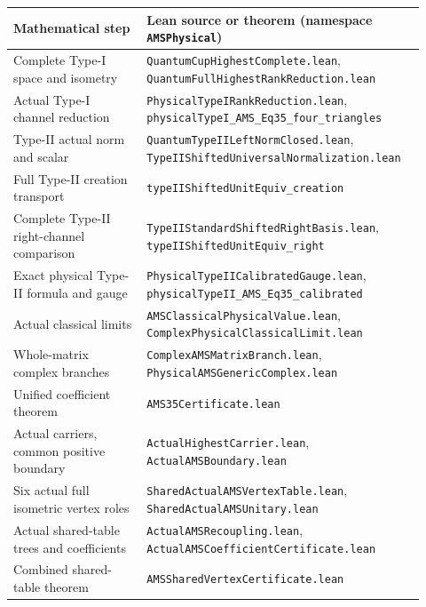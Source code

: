 \documentclass[10pt,a4paper]{article}
\newcommand{\lean}[1]{{\small\nolinkurl{#1}}}
\newenvironment{revision}{\begingroup}{\endgroup}
\begin{document}
\begin{revision}
\begin{center}
\small
\begin{tabular}{>{\raggedright\arraybackslash}p{0.31\linewidth}>{\raggedright\arraybackslash}p{0.61\linewidth}}
\toprule
Mathematical step & Lean source or theorem (namespace \lean{AMSPhysical})\\
\midrule
Complete Type-I space and isometry &
 \lean{QuantumCupHighestComplete.lean},
 \lean{QuantumFullHighestRankReduction.lean}\\[3pt]
Actual Type-I channel reduction &
 \lean{PhysicalTypeIRankReduction.lean},
 \lean{physicalTypeI_AMS_Eq35_four_triangles}\\[3pt]
Type-II actual norm and scalar &
 \lean{QuantumTypeIILeftNormClosed.lean},
 \lean{TypeIIShiftedUniversalNormalization.lean}\\[3pt]
Full Type-II creation transport &
 \lean{typeIIShiftedUnitEquiv_creation}\\[3pt]
Complete Type-II right-channel comparison &
 \lean{TypeIIStandardShiftedRightBasis.lean},
 \lean{typeIIShiftedUnitEquiv_right}\\[3pt]
Exact physical Type-II formula and gauge &
 \lean{PhysicalTypeIICalibratedGauge.lean},
 \lean{physicalTypeII_AMS_Eq35_calibrated}\\[3pt]
Actual classical limits &
 \lean{AMSClassicalPhysicalValue.lean},
 \lean{ComplexPhysicalClassicalLimit.lean}\\[3pt]
Whole-matrix complex branches &
 \lean{ComplexAMSMatrixBranch.lean},
 \lean{PhysicalAMSGenericComplex.lean}\\[3pt]
Unified coefficient theorem & \lean{AMS35Certificate.lean}\\[3pt]
Actual carriers, common positive boundary &
 \lean{ActualHighestCarrier.lean}, \lean{ActualAMSBoundary.lean}\\[3pt]
Six actual full isometric vertex roles &
 \lean{SharedActualAMSVertexTable.lean}, \lean{SharedActualAMSUnitary.lean}\\[3pt]
Actual shared-table trees and coefficients &
 \lean{ActualAMSRecoupling.lean}, \lean{ActualAMSCoefficientCertificate.lean}\\[3pt]
Combined shared-table theorem & \lean{AMSSharedVertexCertificate.lean}\\
\bottomrule
\end{tabular}
\end{center}


\end{revision}
\end{document}
